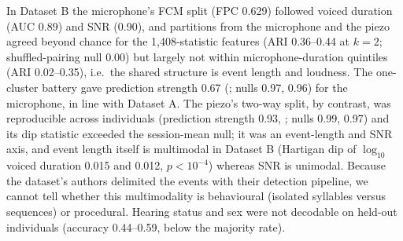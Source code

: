 In Dataset B the microphone's FCM split (FPC 0.629) followed voiced duration (AUC 0.89) and SNR (0.90), and partitions from the microphone and the piezo agreed beyond chance for the 1,408-statistic features (ARI 0.36--0.44 at $k=2$; shuffled-pairing null 0.00) but largely not within microphone-duration quintiles (ARI 0.02--0.35), i.e.\ the shared structure is event length and loudness. The one-cluster battery gave prediction strength 0.67 (; nulls 0.97, 0.96) for the microphone, in line with Dataset A. The piezo's two-way split, by contrast, was reproducible across individuals (prediction strength 0.93, ; nulls 0.99, 0.97) and its dip statistic exceeded the session-mean null; it was an event-length and SNR axis, and event length itself is multimodal in Dataset B (Hartigan dip of $\log_{10}$ voiced duration 0.015 and 0.012, $p<10^{-4}$) whereas SNR is unimodal. Because the dataset's authors delimited the events with their detection pipeline, we cannot tell whether this multimodality is behavioural (isolated syllables versus sequences) or procedural. Hearing status and sex were not decodable on held-out individuals (accuracy 0.44--0.59, below the majority rate).
